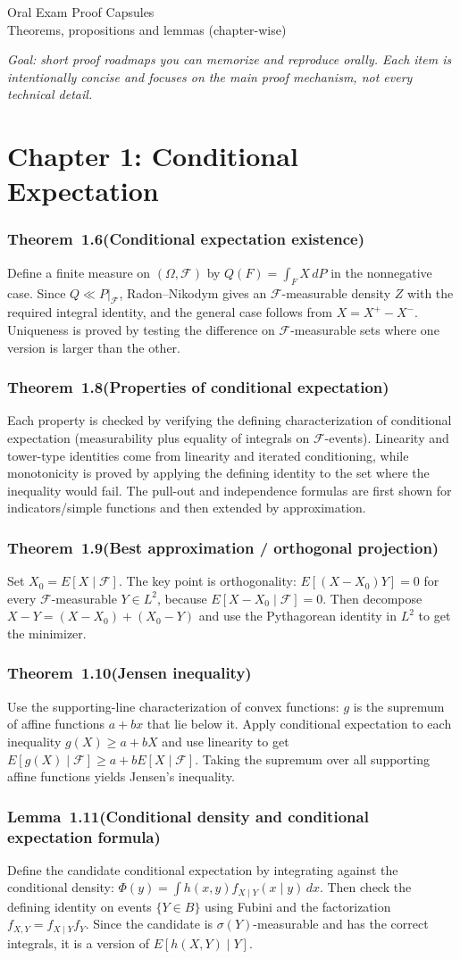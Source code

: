 \documentclass[11pt,a4paper]{article}
\newcommand{\proofcapsule}[4]{%
  \subsubsection*{#1~#2\quad \textnormal{\small(#3)}}%
  #4}
\begin{document}
\begin{center}
{\LARGE Oral Exam Proof Capsules}\\[0.5em]
{\large Theorems, propositions and lemmas (chapter-wise)}
\end{center}
\textit{Goal: short proof roadmaps you can memorize and reproduce orally. Each item is intentionally concise and focuses on the main proof mechanism, not every technical detail.}
\tableofcontents
\newpage
\section{Chapter 1: Conditional Expectation}
\proofcapsule{Theorem}{1.6}{Conditional expectation existence}{Define a finite measure on $(\Omega,\mathcal F)$ by $Q(F)=\int_F X\,dP$ in the nonnegative case. Since $Q\ll P|_{\mathcal F}$, Radon--Nikodym gives an $\mathcal F$-measurable density $Z$ with the required integral identity, and the general case follows from $X=X^+-X^-$. Uniqueness is proved by testing the difference on $\mathcal F$-measurable sets where one version is larger than the other.}
\proofcapsule{Theorem}{1.8}{Properties of conditional expectation}{Each property is checked by verifying the defining characterization of conditional expectation (measurability plus equality of integrals on $\mathcal F$-events). Linearity and tower-type identities come from linearity and iterated conditioning, while monotonicity is proved by applying the defining identity to the set where the inequality would fail. The pull-out and independence formulas are first shown for indicators/simple functions and then extended by approximation.}
\proofcapsule{Theorem}{1.9}{Best approximation / orthogonal projection}{Set $X_0=E[X\mid\mathcal F]$. The key point is orthogonality: $E[(X-X_0)Y]=0$ for every $\mathcal F$-measurable $Y\in L^2$, because $E[X-X_0\mid\mathcal F]=0$. Then decompose $X-Y=(X-X_0)+(X_0-Y)$ and use the Pythagorean identity in $L^2$ to get the minimizer.}
\proofcapsule{Theorem}{1.10}{Jensen inequality}{Use the supporting-line characterization of convex functions: $g$ is the supremum of affine functions $a+bx$ that lie below it. Apply conditional expectation to each inequality $g(X)\ge a+bX$ and use linearity to get $E[g(X)\mid\mathcal F]\ge a+bE[X\mid\mathcal F]$. Taking the supremum over all supporting affine functions yields Jensen's inequality.}
\proofcapsule{Lemma}{1.11}{Conditional density and conditional expectation formula}{Define the candidate conditional expectation by integrating against the conditional density: $\Phi(y)=\int h(x,y)f_{X\mid Y}(x\mid y)\,dx$. Then check the defining identity on events $\{Y\in B\}$ using Fubini and the factorization $f_{X,Y}=f_{X\mid Y}f_Y$. Since the candidate is $\sigma(Y)$-measurable and has the correct integrals, it is a version of $E[h(X,Y)\mid Y]$.}
\end{document}
